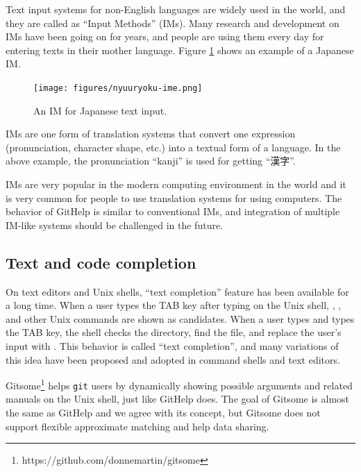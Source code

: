 \documentclass{sigchi}
\def\GH{\textsf{GitHelp}}
\def\GIT{\texttt{git}}
\begin{document}
Text input systems for non-English languages are widely used
in the world,
and they are called as ``Input Methods'' (IMs).
%
Many research and development on IMs have been going on for years, and
people are using them every day for entering texts in their mother language.
Figure \ref{gyaim} shows an example of a Japanese IM.

\begin{figure}[H]
  \centerline{\texttt{[image: figures/nyuuryoku-ime.png]}}
  \caption{An IM for Japanese text input.}
  \label{gyaim}
\end{figure}

IMs are one form of translation systems that convert one
expression (pronunciation, character shape, etc.)
into a textual form of a language.
In the above example, the pronunciation ``kanji''
is used for getting ``漢字''.

IMs are very popular in the modern computing environment in the world
and it is very common for people to 
use translation systems for using computers.
%
The behavior of {\GH} is similar to conventional IMs, and
integration of multiple IM-like systems should be challenged in the future.

\subsection{Text and code completion}

On text editors and Unix shells,
``text completion'' feature has been available for a long time.
%
When a user types the TAB key after typing  on the Unix shell,
, , and other Unix commands are shown as candidates.
When a user types  and types the TAB key,
the shell checks the directory, find the  file, and
replace the user's input with .
This behavior is called ``text completion'', and many variations of
this idea have been proposed and adopted in command shells and text editors.


Gitsome\footnote{\textsf{https:{\slash}{\slash}github.com{\slash}donnemartin{\slash}gitsome}}
helps {\GIT} users by
dynamically showing possible arguments and related manuals on the Unix shell,
just like {\GH} does.
The goal of Gitsome is almost the same as {\GH} and we agree with its concept,
but Gitsome does not support flexible approximate matching and
help data sharing.
\end{document}
